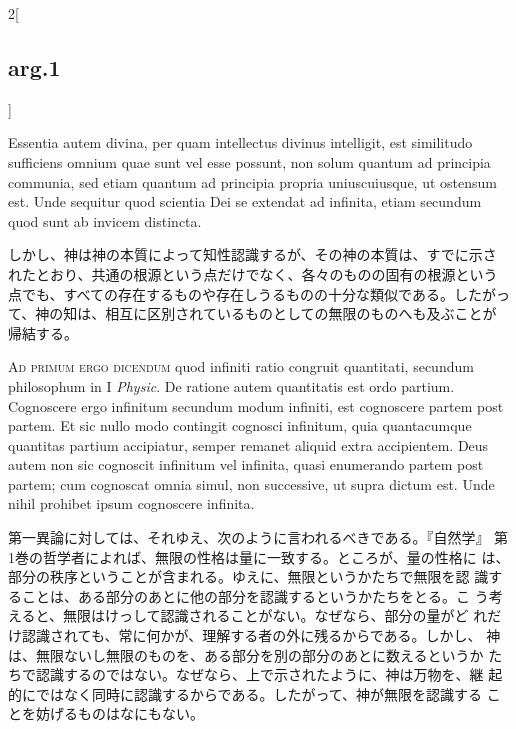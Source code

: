 \documentclass[paper=a4paper,fontsize=10pt,jafontsize=9pt,titlepage]{jlreq}
\begin{document}
\begin{paracol}{2}[\subsection{arg.1}]
\switchcolumn*

Essentia autem divina, per quam intellectus divinus intelligit, est
similitudo sufficiens omnium quae sunt vel esse possunt, non solum
quantum ad principia communia, sed etiam quantum ad principia propria
uniuscuiusque, ut ostensum est. Unde sequitur quod scientia Dei se
extendat ad infinita, etiam secundum quod sunt ab invicem distincta.

\switchcolumn

しかし、神は神の本質によって知性認識するが、その神の本質は、すでに示さ
れたとおり、共通の根源という点だけでなく、各々のものの固有の根源という
点でも、すべての存在するものや存在しうるものの十分な類似である。したがっ
て、神の知は、相互に区別されているものとしての無限のものへも及ぶことが
帰結する。

\switchcolumn*[\subsection{ad.1}]

{\scshape Ad primum ergo dicendum} quod infiniti ratio congruit
quantitati, secundum philosophum in I {\itshape Physic}. De ratione
autem quantitatis est ordo partium. Cognoscere ergo infinitum secundum
modum infiniti, est cognoscere partem post partem. Et sic nullo modo
contingit cognosci infinitum, quia quantacumque quantitas partium
accipiatur, semper remanet aliquid extra accipientem. Deus autem non
sic cognoscit infinitum vel infinita, quasi enumerando partem post
partem; cum cognoscat omnia simul, non successive, ut supra dictum
est. Unde nihil prohibet ipsum cognoscere infinita.

\switchcolumn

第一異論に対しては、それゆえ、次のように言われるべきである。『自然学』
第1巻の哲学者によれば、無限の性格は量に一致する。ところが、量の性格に
は、部分の秩序ということが含まれる。ゆえに、無限というかたちで無限を認
識することは、ある部分のあとに他の部分を認識するというかたちをとる。こ
う考えると、無限はけっして認識されることがない。なぜなら、部分の量がど
れだけ認識されても、常に何かが、理解する者の外に残るからである。しかし、
神は、無限ないし無限のものを、ある部分を別の部分のあとに数えるというか
たちで認識するのではない。なぜなら、上で示されたように、神は万物を、継
起的にではなく同時に認識するからである。したがって、神が無限を認識する
ことを妨げるものはなにもない。

\switchcolumn*[\subsection{ad.2}]


\end{paracol}
\end{document}
